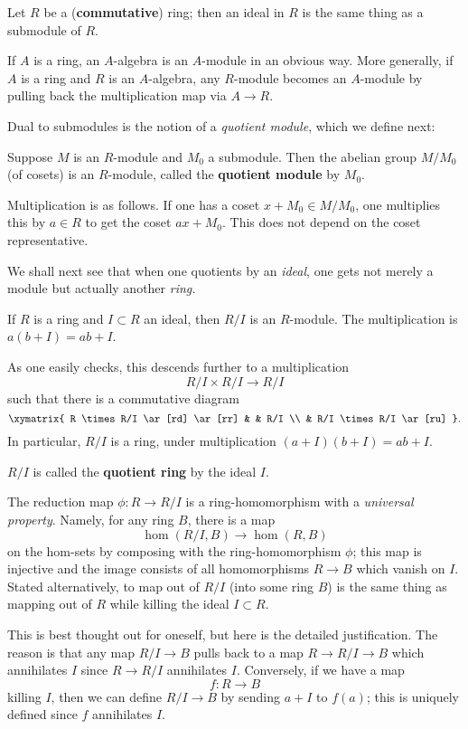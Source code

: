 \begin{example} Let $R$ be a (\textbf{commutative}) ring; then an ideal in $R$
is the same thing as a submodule of $R$. \end{example}

\begin{example} If $A$ is a ring, an $A$-algebra is an $A$-module in an obvious
way. More generally, if $A$ is a ring and $R$ is an $A$-algebra, any $R$-module
becomes an $A$-module by pulling back the multiplication map via $A \to R$.
\end{example}

Dual to submodules is the notion of a \emph{quotient module}, which we define
next: \begin{definition} Suppose $M$ is an $R$-module and $M_0$ a submodule.
Then the abelian group $M/M_0$ (of cosets) is an $R$-module, called the
\textbf{quotient module} by $M_0$.

Multiplication is as follows. If one has a coset $x + M_0 \in M/M_0$, one
multiplies this by $a \in R$ to get the coset $ax + M_0$. This does not depend
on the coset representative. \end{definition}

We shall next see that when one quotients by an \emph{ideal}, one gets not
merely a module but actually another \emph{ring.}

\begin{example} If $R$ is a ring and $I \subset R$ an ideal, then $R/I$ is an
$R$-module. The multiplication is $a(b+I) = ab + I$.

As one easily checks, this descends further to a multiplication \[ R/I \times
R/I \to R/I \] such that there is a commutative diagram \[ \xymatrix{ R \times
R/I \ar[rd] \ar[rr] & & R/I \\ & R/I \times R/I \ar[ru] }.\] In particular,
$R/I$ is a ring, under multiplication $(a+I)(b+I) = ab+I$. \begin{definition}
$R/I$ is called the \textbf{quotient ring} by the ideal $I$. \end{definition}

The reduction map $\phi \colon R \to R/I$ is a ring-homomorphism with a
\emph{universal property}. Namely, for any ring $B$, there is a map \[
\hom(R/I, B) \to \hom(R, B) \] on the hom-sets by composing with the
ring-homomorphism $\phi$; this map is injective and the image consists of all
homomorphisms $R \to B$ which vanish on $I$. Stated alternatively, to map out
of $R/I$ (into some ring $B$) is the same thing as mapping out of $R$ while
killing the ideal $I \subset R$.

This is best thought out for oneself, but here is the detailed justification.
The reason is that any map $R/I \to B$ pulls back to a map $R \to R/I \to B$
which annihilates $I$ since $R \to R/I$ annihilates $I$. Conversely, if we have
a map \[ f: R \to B \] killing $I$, then we can define $R/I \to B$ by sending
$a+I$ to $f(a)$; this is uniquely defined since $f$ annihilates $I$.
\end{example}

